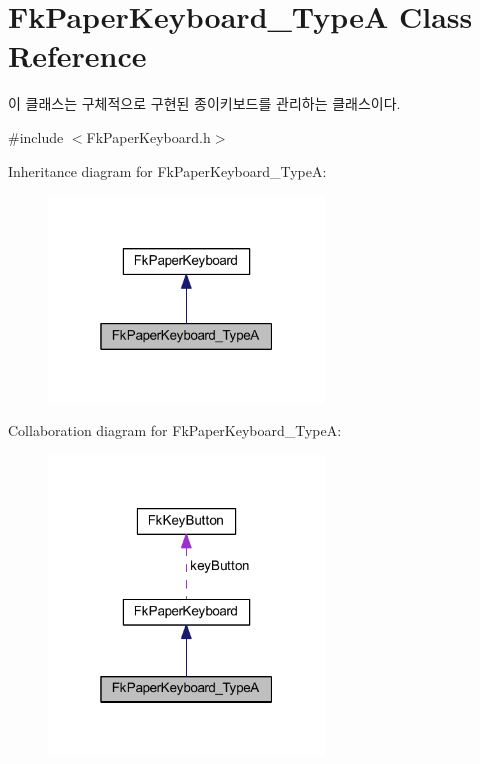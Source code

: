 \hypertarget{class_fk_paper_keyboard___type_a}{}\section{Fk\+Paper\+Keyboard\+\_\+\+Type\+A Class Reference}
\label{class_fk_paper_keyboard___type_a}


이 클래스는 구체적으로 구현된 종이키보드를 관리하는 클래스이다.  




{\ttfamily \#include $<$Fk\+Paper\+Keyboard.\+h$>$}



Inheritance diagram for Fk\+Paper\+Keyboard\+\_\+\+Type\+A\+:
\nopagebreak
\begin{figure}[H]
\begin{center}
\leavevmode
\includegraphics[width=208pt]{class_fk_paper_keyboard___type_a__inherit__graph}
\end{center}
\end{figure}


Collaboration diagram for Fk\+Paper\+Keyboard\+\_\+\+Type\+A\+:
\nopagebreak
\begin{figure}[H]
\begin{center}
\leavevmode
\includegraphics[width=208pt]{class_fk_paper_keyboard___type_a__coll__graph}
\end{center}
\end{figure}
